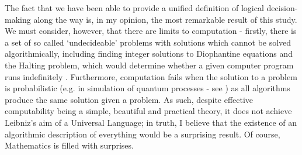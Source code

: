 \documentclass {article}
\begin{document}
The fact that we have been able to provide a unified definition of logical decision-making along the way is, in my opinion, the most remarkable result of this study. We must consider, however, that there are limits to computation - firstly, there is a set of so called `undecideable' problems with solutions which cannot be solved algorithmically, including finding integer solutions to Diophantine equations \cite{matiyasevich1993hilbert} and the Halting problem, which would determine whether a given computer program runs indefinitely \cite{turing1936computablenumbers}. Furthermore, computation fails when the solution to a problem is probabilistic (e.g. in simulation of quantum processes - see \cite{feynman1982simulating}) as all algorithms produce the same solution given a problem. As such, despite effective computability being a simple, beautiful and practical theory, it does not achieve Leibniz's aim of a Universal Language; in truth, I believe that the existence of an algorithmic description of everything would be a surprising result. Of course, Mathematics is filled with surprises.


\clearpage


\end{document}
